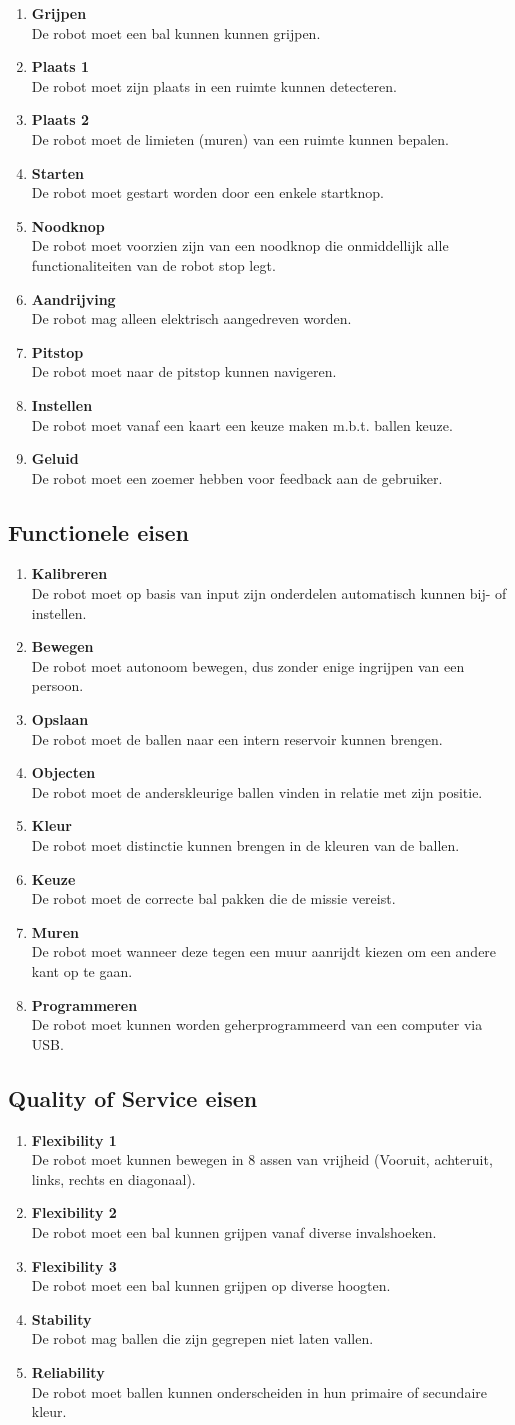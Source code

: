 \documentclass[12pt]{article} %
\begin{document}
\newcommand\litem[1]{\item{\bfseries #1\\}}
\begin{enumerate}
\litem{Grijpen} De robot moet een bal kunnen kunnen grijpen.
\litem{Plaats 1} De robot moet zijn plaats in een ruimte kunnen detecteren.
\litem{Plaats 2} De robot moet de limieten (muren) van een ruimte kunnen bepalen.
\litem{Starten} De robot moet gestart worden door een enkele startknop.
\litem{Noodknop} De robot moet voorzien zijn van een noodknop die onmiddellijk alle functionaliteiten van de robot stop legt.
\litem{Aandrijving} De robot mag alleen elektrisch aangedreven worden.
\litem{Pitstop} De robot moet naar de pitstop kunnen navigeren.
\litem{Instellen} De robot moet vanaf een kaart een keuze maken m.b.t. ballen keuze.
\litem{Geluid} De robot moet een zoemer hebben voor feedback aan de gebruiker.
\end{enumerate}

\subsection{Functionele eisen}
\begin{enumerate}
\litem{Kalibreren} De robot moet op basis van input zijn onderdelen automatisch kunnen bij- of instellen.
\litem{Bewegen} De robot moet autonoom bewegen, dus zonder enige ingrijpen van een persoon.
\litem{Opslaan} De robot moet de ballen naar een intern reservoir kunnen brengen.
\litem{Objecten} De robot moet de anderskleurige ballen vinden in relatie met zijn positie.
\litem{Kleur} De robot moet distinctie kunnen brengen in de kleuren van de ballen. 
\litem{Keuze} De robot moet de correcte bal pakken die de missie vereist.
\litem{Muren} De robot moet wanneer deze tegen een muur aanrijdt kiezen om een andere kant op te gaan.
\litem{Programmeren} De robot moet kunnen worden geherprogrammeerd van een computer via USB.  
\end{enumerate}
\newpage

\subsection{Quality of Service eisen}
\begin{enumerate}
\litem{Flexibility 1} De robot moet kunnen bewegen in 8 assen van vrijheid (Vooruit, achteruit, links, rechts en diagonaal).
\litem{Flexibility 2} De robot moet een bal kunnen grijpen vanaf diverse invalshoeken.
\litem{Flexibility 3} De robot moet een bal kunnen grijpen op diverse hoogten.
\litem{Stability} De robot mag ballen die zijn gegrepen niet laten vallen.
\litem{Reliability} De robot moet ballen kunnen onderscheiden in hun primaire of secundaire kleur.
\end{enumerate}
\end{document}
